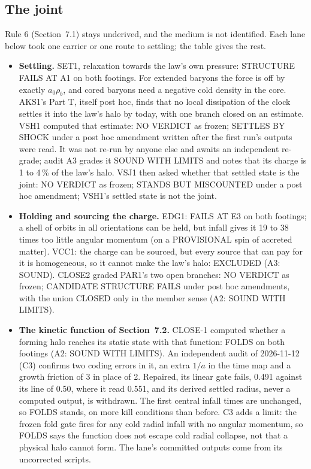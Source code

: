 \documentclass[10pt]{article}
\begin{document}
\subsection{The joint}
Rule 6 (Section~7.1) stays underived, and the medium is not identified. Each lane below took one carrier or one route to settling; the table gives the rest.
\begin{itemize}
\item \textbf{Settling.} SET1, relaxation towards the law's own pressure: STRUCTURE FAILS AT A1 on both footings. For extended baryons the force is off by exactly $a_0\rho_b$, and cored baryons need a negative cold density in the core. AKS1's Part T, itself post hoc, finds that no local dissipation of the clock settles it into the law's halo by today, with one branch closed on an estimate. VSH1 computed that estimate: NO VERDICT as frozen; SETTLES BY SHOCK under a post hoc amendment written after the first run's outputs were read. It was not re-run by anyone else and awaits an independent re-grade; audit A3 grades it SOUND WITH LIMITS and notes that its charge is 1 to 4\,\% of the law's halo. VSJ1 then asked whether that settled state is the joint: NO VERDICT as frozen; STANDS BUT MISCOUNTED under a post hoc amendment; VSH1's settled state is not the joint.
\item \textbf{Holding and sourcing the charge.} EDG1: FAILS AT E3 on both footings; a shell of orbits in all orientations can be held, but infall gives it 19 to 38 times too little angular momentum (on a PROVISIONAL spin of accreted matter). VCC1: the charge can be sourced, but every source that can pay for it is homogeneous, so it cannot make the law's halo: EXCLUDED (A3: SOUND). CLOSE2 graded PAR1's two open branches: NO VERDICT as frozen; CANDIDATE STRUCTURE FAILS under post hoc amendments, with the union CLOSED only in the member sense (A2: SOUND WITH LIMITS).
\item \textbf{The kinetic function of Section~7.2.} CLOSE-1 computed whether a forming halo reaches its static state with that function: FOLDS on both footings (A2: SOUND WITH LIMITS). An independent audit of 2026-11-12 (C3) confirms two coding errors in it, an extra $1/a$ in the time map and a growth friction of 3 in place of 2. Repaired, its linear gate fails, 0.491 against its line of 0.50, where it read 0.551, and its derived settled radius, never a computed output, is withdrawn. The first central infall times are unchanged, so FOLDS stands, on more kill conditions than before. C3 adds a limit: the frozen fold gate fires for any cold radial infall with no angular momentum, so FOLDS says the function does not escape cold radial collapse, not that a physical halo cannot form. The lane's committed outputs come from its uncorrected scripts.

\end{itemize}
\end{document}
